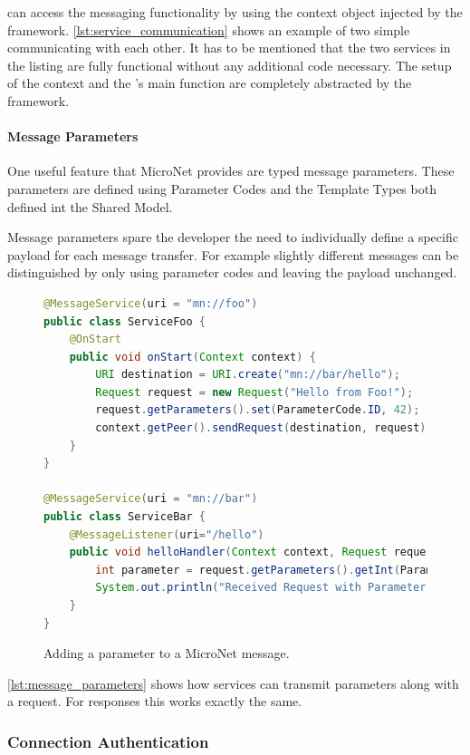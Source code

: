 \mss{} can access the messaging functionality by using the context object
injected by the framework. \autoref{lst:service_communication} shows an example
of two simple \mss{} communicating with each other. It has to be mentioned that
the two services in the listing are fully functional without any additional
code necessary. The setup of the context and the \ms{}'s main function are
completely abstracted by the framework.

\paragraph{Message Parameters}

One useful feature that MicroNet provides are typed message parameters. These
parameters are defined using Parameter Codes and the Template Types both defined
int the Shared Model.

Message parameters spare the developer the need to individually define a
specific payload for each message transfer. For example slightly different
messages can be distinguished by only using parameter codes and leaving the
payload unchanged.

\begin{figure}
\begin{lstlisting}[language=Java,firstnumber=1] 
@MessageService(uri = "mn://foo")
public class ServiceFoo {
	@OnStart
	public void onStart(Context context) {
		URI destination = URI.create("mn://bar/hello");
		Request request = new Request("Hello from Foo!");
		request.getParameters().set(ParameterCode.ID, 42);
		context.getPeer().sendRequest(destination, request);
	}
}

@MessageService(uri = "mn://bar")
public class ServiceBar {
	@MessageListener(uri="/hello")
	public void helloHandler(Context context, Request request) {
		int parameter = request.getParameters().getInt(ParameterCode.ID);
		System.out.println("Received Request with Parameter: " + parameter);
	}
}
\end{lstlisting}
\caption{Adding a parameter to a MicroNet message.}
\label{lst:message_parameters}
\end{figure}

\autoref{lst:message_parameters} shows how services can transmit parameters
along with a request. For responses this works exactly the same.

\subsubsection{Connection Authentication}

